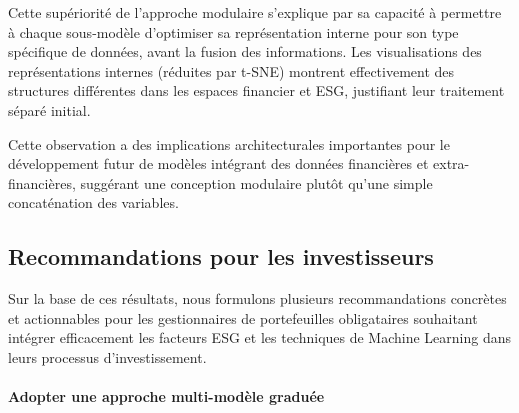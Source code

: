 Cette supériorité de l'approche modulaire s'explique par sa capacité à permettre à chaque sous-modèle d'optimiser sa représentation interne pour son type spécifique de données, avant la fusion des informations. Les visualisations des représentations internes (réduites par t-SNE) montrent effectivement des structures différentes dans les espaces financier et ESG, justifiant leur traitement séparé initial.

Cette observation a des implications architecturales importantes pour le développement futur de modèles intégrant des données financières et extra-financières, suggérant une conception modulaire plutôt qu'une simple concaténation des variables.

\subsection*{Recommandations pour les investisseurs}

Sur la base de ces résultats, nous formulons plusieurs recommandations concrètes et actionnables pour les gestionnaires de portefeuilles obligataires souhaitant intégrer efficacement les facteurs ESG et les techniques de Machine Learning dans leurs processus d'investissement.

\paragraph{Adopter une approche multi-modèle graduée}

